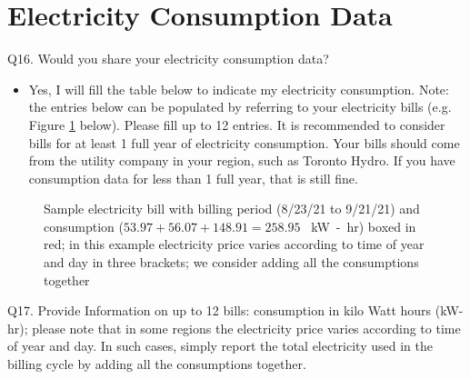 \documentclass[12pt]{article}
\begin{document}
\pagebreak

\section{Electricity Consumption Data}

Q16. Would you share your electricity consumption data?

\begin{itemize}
\item Yes, I will fill the table below to indicate my electricity consumption. Note: the entries below can be populated by referring to your electricity bills (e.g. Figure \ref{Hydro} below). Please fill up to 12 entries. It is recommended to consider bills for at least 1 full year of electricity consumption. Your bills should come from the utility company in your region, such as Toronto Hydro. If you have consumption data for less than 1 full year, that is still fine.
\end{itemize}

\begin{figure}[H]
\begin{center}
\caption{Sample electricity bill with billing period (8/23/21 to 9/21/21) and consumption ($53.97 + 56.07 + 148.91 = 258.95$ \SI{}{kW-hr}) boxed in red; in this example electricity price varies according to time of year and day in three brackets; we consider adding all the consumptions together}
\label{Hydro}
\end{center}
\end{figure}

\pagebreak

Q17. Provide Information on up to 12 bills: consumption in kilo Watt hours (kW-hr); please note that in some regions the electricity price varies according to time of year and day. In such cases, simply report the total electricity used in the billing cycle by adding all the consumptions together.
\end{document}
